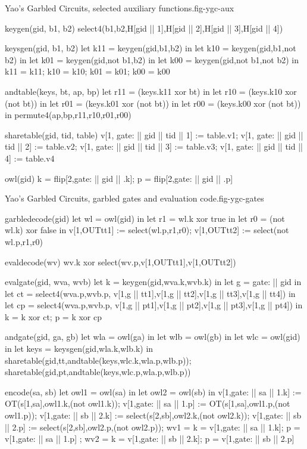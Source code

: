 \begin{fpfig}{Yao's Garbled Circuits, selected auxiliary functions.}{fig-ygc-aux}
{\footnotesize
\begin{verbatimtab}
  keygen(gid, b1, b2) { select4(b1,b2,H[gid || 1],H[gid || 2],H[gid || 3],H[gid || 4]) }
  
  keysgen(gid, b1, b2)
  {
    let k11 = keygen(gid,b1,b2) in
    let k10 = keygen(gid,b1,not b2) in
    let k01 = keygen(gid,not b1,b2) in
    let k00 = keygen(gid,not b1,not b2) in
    {k11 = k11; k10 = k10; k01 = k01; k00 = k00}
  }
  
  andtable(keys, bt, ap, bp)
  {
    let r11 = (keys.k11 xor bt) in 
    let r10 = (keys.k10 xor (not bt)) in
    let r01 = (keys.k01 xor (not bt)) in
    let r00 = (keys.k00 xor (not bt)) in
    permute4(ap,bp,r11,r10,r01,r00)
  }
  
  sharetable(gid, tid, table)
  {   
    v[1, gate: || gid || tid || 1] := table.v1;
    v[1, gate: || gid || tid || 2] := table.v2;
    v[1, gate: || gid || tid || 3] := table.v3;
    v[1, gate: || gid || tid || 4] := table.v4
  }

  owl(gid) {  { k = flip[2,gate: || gid || .k]; p = flip[2,gate: || gid || .p] }  }
\end{verbatimtab}
}
\end{fpfig}

\begin{fpfig}{Yao's Garbled Circuits, garbled gates and evaluation code.}{fig-ygc-gates}
{\footnotesize
\begin{verbatimtab}
  garbledecode(gid)    
  {
    let wl = owl(gid) in
    let r1 = wl.k xor true in
    let r0 = (not wl.k) xor false in
    v[1,OUTtt1] := select(wl.p,r1,r0);
    v[1,OUTtt2] := select(not wl.p,r1,r0)
  }
  
  evaldecode(wv) { wv.k xor select(wv.p,v[1,OUTtt1],v[1,OUTtt2]) }
  
  evalgate(gid, wva, wvb)  
  {
    let k = keygen(gid,wva.k,wvb.k) in
    let g = gate: || gid in
    let ct = select4(wva.p,wvb.p,
               v[1,g || tt1],v[1,g || tt2],v[1,g || tt3],v[1,g || tt4]) in
    let cp = select4(wva.p,wvb.p,
               v[1,g || pt1],v[1,g || pt2],v[1,g || pt3],v[1,g || pt4]) in
    { k = k xor ct; p = k xor cp }
  }
  
  andgate(gid, ga, gb) 
  {
    let wla = owl(ga) in
    let wlb = owl(gb) in
    let wlc = owl(gid) in
    let keys = keysgen(gid,wla.k,wlb.k) in
    sharetable(gid,tt,andtable(keys,wlc.k,wla.p,wlb.p));
    sharetable(gid,pt,andtable(keys,wlc.p,wla.p,wlb.p))
  }

  encode(sa, sb)
  {
    let owl1 = owl(sa) in
    let owl2 = owl(sb) in
    v[1,gate: || sa || 1.k] := OT(s[1,sa],owl1.k,(not owl1.k));
    v[1,gate: || sa || 1.p] := OT(s[1,sa],owl1.p,(not owl1.p));
    v[1,gate: || sb || 2.k] := select(s[2,sb],owl2.k,(not owl2.k));
    v[1,gate: || sb || 2.p] := select(s[2,sb],owl2.p,(not owl2.p));
    { wv1 = { k = v[1,gate: || sa || 1.k]; p = v[1,gate: || sa || 1.p] };
      wv2 = { k = v[1,gate: || sb || 2.k]; p = v[1,gate: || sb || 2.p] } }
  }
\end{verbatimtab}
}
\end{fpfig}

